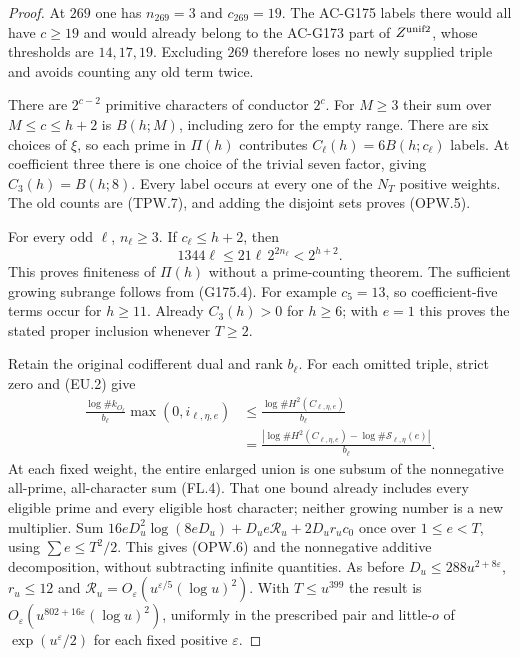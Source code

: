 \begin{proof}
At $269$ one has $n_{269}=3$ and $c_{269}=19$.
The AC-G175 labels there would all have $c\geq19$ and would
already belong to the AC-G173 part of $Z^{\rm unif2}$, whose
thresholds are $14,17,19$.  Excluding $269$ therefore loses
no newly supplied triple and avoids counting any old term twice.

There are $2^{c-2}$ primitive characters of conductor $2^c$.
For $M\geq3$ their sum over $M\leq c\leq h+2$ is
$B(h;M)$, including zero for the empty range.
There are six choices of $\xi$, so each prime in $\Pi(h)$
contributes $C_\ell(h)=6B(h;c_\ell)$ labels.
At coefficient three there is one choice of the trivial seven
factor, giving $C_3(h)=B(h;8)$.
Every label occurs at every one of the $N_T$ positive weights.
The old counts are (TPW.7), and adding the disjoint sets proves (OPW.5).

For every odd $\ell$, $n_\ell\geq3$.
If $c_\ell\leq h+2$, then
\[
       1344\ell\leq21\ell\,2^{2n_\ell}<2^{h+2}.
 \tag{OPW.8}
\]
This proves finiteness of $\Pi(h)$ without a prime-counting theorem.
The sufficient growing subrange follows from (G175.4).
For example $c_5=13$, so coefficient-five terms occur for $h\geq11$.
Already $C_3(h)>0$ for $h\geq6$; with $e=1$ this proves the
stated proper inclusion whenever $T\geq2$.

Retain the original codifferent dual and rank $b_\ell$.
For each omitted triple, strict zero and (EU.2) give
\[
 \begin{aligned}
 \frac{\log\#k_{O_\ell}}{b_\ell}\max(0,i_{\ell,\eta,e})
 &\leq\frac{\log\#H^2(C_{\ell,\eta,e})}{b_\ell}\\
 &=\frac{|\log\#H^2(C_{\ell,\eta,e})
                  -\log\#\mathcal S_{\ell,\eta}(e)|}{b_\ell}.
 \end{aligned}
 \tag{OPW.9}
\]
At each fixed weight, the entire enlarged union is one subsum
of the nonnegative all-prime, all-character sum (FL.4).
That one bound already includes every eligible prime and every
eligible host character; neither growing number is a new multiplier.
Sum $16eD_u^2\log(8eD_u)+D_ue\mathcal R_u+2D_ur_uc_0$
once over $1\leq e<T$, using $\sum e\leq T^2/2$.
This gives (OPW.6) and the nonnegative additive decomposition,
without subtracting infinite quantities.
As before $D_u\leq288u^{2+8\varepsilon}$, $r_u\leq12$ and
$\mathcal R_u=O_\varepsilon(u^{\varepsilon/5}(\log u)^2)$.
With $T\leq u^{399}$ the result is
$O_\varepsilon(u^{802+16\varepsilon}(\log u)^2)$,
uniformly in the prescribed pair and little-$o$ of
$\exp(u^\varepsilon/2)$ for each fixed positive $\varepsilon$.


\end{proof}
